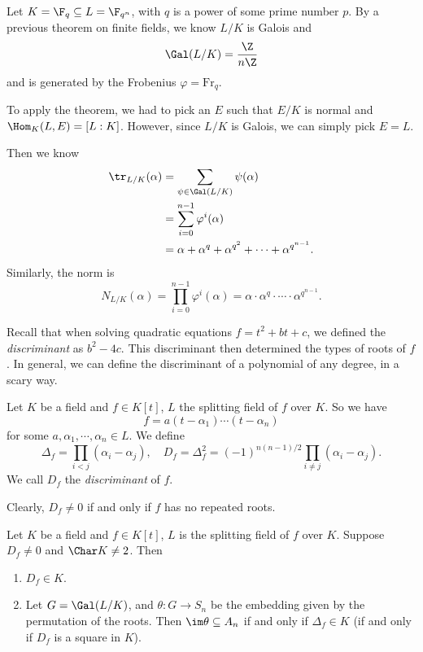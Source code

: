 \documentclass[a4paper]{article}
\newcommand\Fr{\mathrm{Fr}}
\begin{document}
\begin{eg}
  Let $K = \F_q \subseteq L = \F_{q^n}$, with $q$ is a power of some prime number $p$. By a previous theorem on finite fields, we know $L/K$ is Galois and
  \[
    \Gal(L/K) = \frac{\Z}{n\Z}
  \]
  and is generated by the Frobenius $\varphi = \Fr_q$.

  To apply the theorem, we had to pick an $E$ such that $E/K$ is normal and $\Hom_K(L, E) = [L:K]$. However, since $L/K$ is Galois, we can simply pick $E = L$.

  Then we know
  \begin{align*}
    \tr_{L/K}(\alpha) &= \sum_{\psi \in \Gal(L/K)} \psi(\alpha) \\
    &= \sum_{i = 0}^{n - 1} \varphi^i (\alpha)\\
    &= \alpha + \alpha^q + \alpha^{q^2} + \cdots + \alpha^{q^{n - 1}}.
  \end{align*}
  Similarly, the norm is
  \[
    N_{L/K}(\alpha) = \prod_{i = 0}^{n - 1} \varphi^i (\alpha) = \alpha\cdot \alpha^q \cdot \cdots \cdot \alpha^{q^{n - 1}}.
  \]
\end{eg}

Recall that when solving quadratic equations $f = t^2 + bt + c$, we defined the \emph{discriminant} as $b^2 - 4c$. This discriminant then determined the types of roots of $f$. In general, we can define the discriminant of a polynomial of any degree, in a scary way.

\begin{defi}[Discriminant]
  Let $K$ be a field and $f \in K[t]$, $L$ the splitting field of $f$ over $K$. So we have
  \[
    f = a(t - \alpha_1)\cdots(t - \alpha_n)
  \]
  for some $a, \alpha_1, \cdots, \alpha_n \in L$. We define
  \[
    \Delta_f = \prod_{i < j}(\alpha_i - \alpha_j),\quad D_f = \Delta_f^2 = (-1)^{n(n - 1)/2} \prod_{i \not= j} (\alpha_i - \alpha_j).
  \]
  We call $D_f$ the \emph{discriminant} of $f$.
\end{defi}
Clearly, $D_f \not= 0$ if and only if $f$ has no repeated roots.

\begin{thm}
  Let $K$ be a field and $f \in K[t]$, $L$ is the splitting field of $f$ over $K$. Suppose $D_f \not= 0$ and $\Char K \not= 2$. Then
  \begin{enumerate}
    \item $D_f \in K$.
    \item Let $G = \Gal(L/K)$, and $\theta: G \to S_n$ be the embedding given by the permutation of the roots. Then $\im \theta \subseteq A_n$ if and only if $\Delta_f \in K$ (if and only if $D_f$ is a square in $K$).
  \end{enumerate}
\end{thm}
\end{document}
